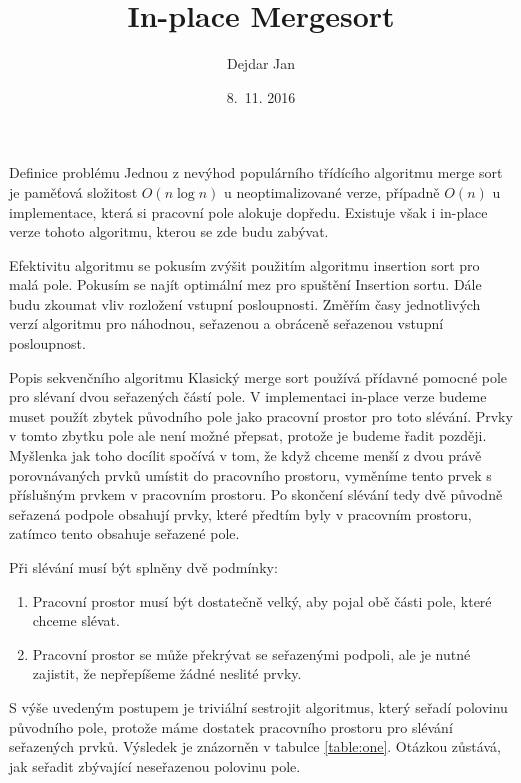 \documentclass[a4paper,11pt]{article}
\title{In-place Mergesort}
\author{Dejdar Jan}
\date{8.~11. 2016}
\begin{document}
\maketitle


\begin{section}{Definice problému}
Jednou z nevýhod populárního třídícího algoritmu merge sort je paměťová
složitost $O(n\log{n})$ u neoptimalizované verze, případně $O(n)$ u implementace,
která si pracovní pole alokuje dopředu. Existuje však i in-place verze tohoto algoritmu,
kterou se zde budu zabývat. 

Efektivitu algoritmu se pokusím zvýšit použitím algoritmu insertion sort pro malá pole.
Pokusím se najít optimální mez pro spuštění Insertion sortu. Dále budu zkoumat vliv rozložení 
vstupní posloupnosti. Změřím časy jednotlivých verzí  algoritmu pro náhodnou, seřazenou
a obráceně seřazenou vstupní posloupnost.

\begin{subsection}{Popis sekvenčního algoritmu}
Klasický merge sort používá přídavné pomocné pole pro slévaní dvou seřazených částí pole.
V implementaci in-place verze budeme muset použít zbytek původního pole jako pracovní prostor
pro toto slévání. Prvky v tomto zbytku pole ale není možné přepsat, protože je budeme řadit později.
Myšlenka jak toho docílit spočívá v tom, že když chceme menší z dvou právě porovnávaných prvků
umístit do pracovního prostoru, vyměníme tento prvek s příslušným prvkem v pracovním prostoru.
Po skončení slévání tedy dvě původně seřazená podpole obsahují prvky, které předtím byly v
pracovním prostoru, zatímco tento obsahuje seřazené pole.

Při slévání musí být splněny dvě podmínky:
\begin{enumerate}
	\item Pracovní prostor musí být dostatečně velký, aby pojal obě části pole, které chceme slévat.
	\item Pracovní prostor se může překrývat se seřazenými podpoli, ale je nutné zajistit, že nepřepíšeme
		žádné neslité prvky.
\end{enumerate}
\pagebreak

S výše uvedeným postupem je triviální sestrojit algoritmus, který seřadí polovinu původního pole, 
protože máme dostatek pracovního prostoru pro slévání seřazených prvků. Výsledek je znázorněn v tabulce \ref{table:one}.
Otázkou zůstává, jak seřadit zbývající neseřazenou polovinu pole.



\end{subsection}
\end{section}
\end{document}
